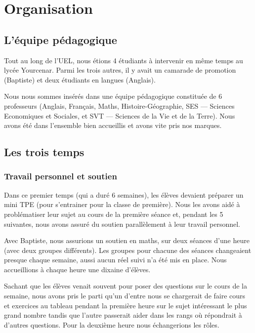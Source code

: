 \section{Organisation}

\subsection{L'équipe pédagogique}

Tout au long de l'UEL, nous étions 4 étudiants à intervenir en même temps au lycée Yourcenar. Parmi les trois autres, il
y avait un camarade de promotion (Baptiste) et deux étudiants en langues (Anglais).

Nous nous sommes insérés dans une équipe pédagogique constituée de 6 professeurs (Anglais, Français, Maths,
Histoire-Géographie, SES --- Sciences Economiques et Sociales, et SVT --- Sciences de la Vie et de la Terre). Nous
avons été dans l'ensemble bien accueillis et avons vite pris nos marques.

\subsection{Les trois temps}

\subsubsection{Travail personnel et soutien}

Dans ce premier temps (qui a duré 6 semaines), les élèves devaient préparer un mini TPE (pour s'entrainer pour la classe
de première). Nous les avons aidé à problématiser leur sujet au cours de la première séance et, pendant les 5 suivantes,
nous avons assuré du soutien parallèlement à leur travail personnel.

Avec Baptiste, nous assurions un soutien en maths, sur deux séances d'une heure (avec deux groupes différents). Les
groupes pour chacune des séances changeaient presque chaque semaine, aussi aucun réel suivi n'a été mis en place. Nous
accueillions à chaque heure une dixaine d'élèves.

Sachant que les élèves venait souvent pour poser des questions sur le cours de la semaine, nous avons pris le parti
qu'un d'entre nous se chargerait de faire cours et exercices au tableau pendant la première heure sur le sujet intéressant
le plus grand nombre tandis que l'autre passerait aider dans les rangs où répondrait à d'autres questions. Pour la
deuxième heure nous échangerions les rôles.

